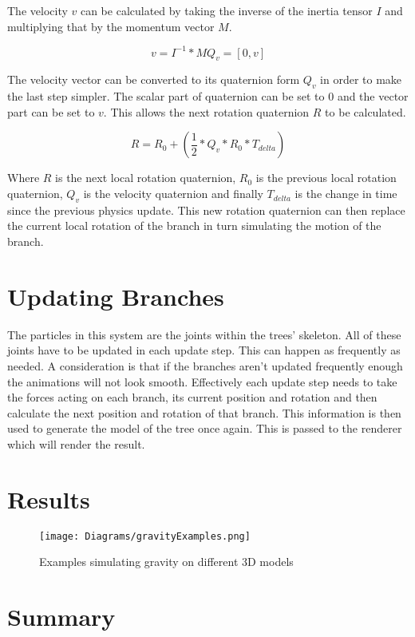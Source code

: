 \noindent
The velocity $v$ can be calculated by taking the inverse of the inertia tensor $I$ and multiplying that by the momentum vector $M$.

\begin{equation}
v = I^{-1} * M
Q_v = [0, v]
\end{equation}

\noindent
The velocity vector can be converted to its quaternion form $Q_v$ in order to make the last step simpler. The scalar part of quaternion can be set to 0 and the vector part can be set to $v$. This allows the next rotation quaternion $R$ to be calculated. 

\begin{equation}
R = R_0 + (\frac{1}{2} * Q_v * R_0 * T_{delta})
\end{equation}

\noindent
Where $R$ is the next local rotation quaternion, $R_0$ is the previous local rotation quaternion, $Q_v$ is the velocity quaternion and finally $T_{delta}$ is the change in time since the previous physics update. This new rotation quaternion can then replace the current local rotation of the branch in turn simulating the motion of the branch.

\section{Updating Branches}

The particles in this system are the joints within the trees' skeleton. All of these joints have to be updated in each update step. This can happen as frequently as needed. A consideration is that if the branches aren't updated frequently enough the animations will not look smooth. Effectively each update step needs to take the forces acting on each branch, its current position and rotation and then calculate the next position and rotation of that branch. This information is then used to generate the model of the tree once again. This is passed to the renderer which will render the result. 

\section{Results}

\begin{figure}[htbp]
	{\centering
		\vspace{7px}
		\texttt{[image: Diagrams/gravityExamples.png]}
		\label{3DAxisFigure} \label{Gravity applied to generated models}
		\caption{Examples simulating gravity on different 3D models}
	}
\end{figure}
\FloatBarrier

\section{Summary}


